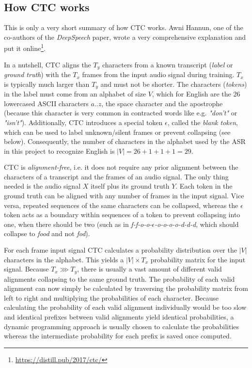 \subsection{How CTC works}
\label{ctc-summary}

This is only a very short summary of how \ac{CTC} works. Awni Hannun, one of the co-authors of the \textit{DeepSpeech} paper, wrote a very comprehensive explanation and put it online\footnote{\url{https://distill.pub/2017/ctc/}}.

In a nutshell, \ac{CTC} aligns the $T_y$ characters from a known transcript (\textit{label} or \textit{ground truth}) with the $T_x$ frames from the input audio signal during training. $T_x$ is typically much larger than $T_y$ and must not be shorter. The characters (\textit{tokens}) in the label must come from an alphabet of size $V$, which for English are the 26 lowercased ASCII characters $a..z$, the space character and the apostrophe (because this character is very common in contracted words like e.g. \textit{"don't"} or \textit{"isn't"}). Additionally, \ac{CTC} introduces a special token $\epsilon$, called the \textit{blank token}, which can be used to label unknown/silent frames or prevent collapsing (see below). Consequently, the number of characters in the alphabet used by the \ac{ASR} in this project to recognize English is $|V|=26+1+1+1=29$.

\ac{CTC} is \textit{alignment-free}, i.e. it does not require any prior alignment between the characters of a transcript and the frames of an audio signal. The only thing needed is the audio signal $X$ itself plus its ground truth $Y$. Each token in the ground truth can be aligned with any number of frames in the input signal. Vice versa, repeated sequences of the same characters can be collapsed, whereas the $\epsilon$ token acts as a boundary within sequences of a token to prevent collapsing into one, when there should be two (such as in \textit{f-f-o-o-$\epsilon$-o-o-o-o-d-d-d}, which should collapse to \textit{food} and not \textit{fod}). 

For each frame input signal \ac{CTC} calculates a probability distribution over the $|V|$ characters in the alphabet. This yields a $|V| \times T_x$ probability matrix for the input signal. Because $T_x \ggg T_y$, there is usually a vast amount of different valid alignments collapsing to the same ground truth. The probability of each valid alignment can now simply be calculated by traversing the probability matrix from left to right and multiplying the probabilities of each character. Because calculating the probability of each valid alignment individually would be too slow and identical prefixes between valid alignments yield identical probabilities, a dynamic programming approach is usually chosen to calculate the probabilities whereas the intermediate probability for each prefix is saved once computed.

